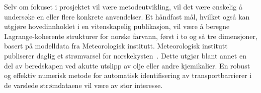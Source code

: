 Selv om fokuset i prosjektet vil være metodeutvikling, vil det være ønskelig å undersøke en eller flere konkrete anvendelser. Et håndfast mål, hvilket også kan utgjøre hovedinnholdet i en vitenskapelig
publikasjon, vil være å beregne Lagrange-koherente strukturer
for norske farvann, først i to og så tre dimensjoner, basert på modelldata fra
Meteorologisk institutt. Meteorologisk institutt publiserer daglig et strømvarsel for norskekysten~\parencite{norkyst800}. Dette utgjør blant annet en del av beredskapen ved akutte utslipp av olje eller andre kjemikalier. En robust og effektiv numerisk metode for automatisk identifisering av transportbarrierer i de varslede strømdataene vil være av stor interesse.
